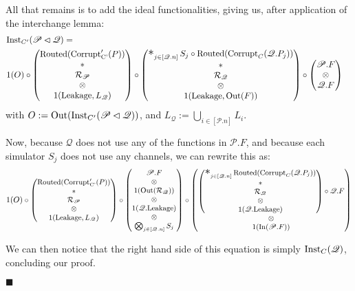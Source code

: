 \begin{theorem}
All that remains is to add the ideal functionalities, giving us,
after application of the interchange lemma:
$$
\begin{aligned}
  &\tx{Inst}_{C'}(\mathscr{P} \lhd \mathscr{Q}) =\cr
&1(O) \circ
\begin{pmatrix}
  \tx{Routed}(\tx{Corrupt}'_{\tx{C'}}(P))\cr
  *\cr
  \mathcal{R}_{\mathscr{P}}\cr
  \otimes\cr
  1(\tx{Leakage}, L_{\mathscr{Q}})
\end{pmatrix}
\circ
\begin{pmatrix}
\bigast_{j \in [\mathscr{Q}.n]}
  S_j \circ \tx{Routed}(\tx{Corrupt}_C(\mathscr{Q}.P_j))
  \cr
  *\cr
  \mathcal{R}_{\mathscr{Q}}\cr
  \otimes\cr
  1(\tx{Leakage}, \tx{Out}(F))
\end{pmatrix}
\circ
\begin{pmatrix}
  \mathscr{P}.F\cr
  \otimes\cr
  \mathscr{Q}.F
\end{pmatrix}
\end{aligned}
$$
with $O := \text{Out}(\text{Inst}_{C'}(\mathscr{P} \lhd \mathscr{Q}))$,
and $L_{\mathscr{Q}} := \bigcup_{i \in [\mathscr{P}.n]} L_i$.

Now, because $\mathscr{Q}$ does not use any of the functions
in $\mathscr{P}.F$, and because each simulator $S_j$
does not use any channels, we can rewrite this as:
$$
\small
1(O) \circ
\begin{pmatrix}
  \tx{Routed}(\tx{Corrupt}'_{\tx{C'}}(P))\cr
  *\cr
  \mathcal{R}_{\mathscr{P}}\cr
  \otimes\cr
  1(\tx{Leakage}, L_{\mathscr{Q}})
\end{pmatrix}
\circ
\begin{pmatrix}
  \mathscr{P}.F\cr
  \otimes\cr
  1(\tx{Out}(\mathcal{R}_{\mathscr{Q}}))\cr
  \otimes\cr
  1(\mathscr{Q}.\tx{Leakage})\cr
  \otimes\cr
  \bigotimes_{j \in [\mathscr{Q}.n]} S_j
\end{pmatrix}
\circ
\begin{pmatrix}
\begin{pmatrix}
\bigast_{j \in [\mathscr{Q}.n]}
  \tx{Routed}(\tx{Corrupt}_C(\mathscr{Q}.P_j))
  \cr
  *\cr
  \mathcal{R}_{\mathscr{Q}}\cr
  \otimes\cr
  1(\mathscr{Q}.\tx{Leakage})
\end{pmatrix}
\circ
  \mathscr{Q}.F
  \cr
  \otimes\cr
  1(\tx{In}(\mathscr{P}.F))
\end{pmatrix}
$$

We can then notice that the right hand side of this equation
is simply $\text{Inst}_C(\mathscr{Q})$,
concluding our proof.

$\blacksquare$

\end{theorem}

